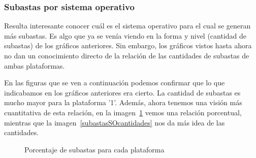 \documentclass[a4paper, 12pt]{article}
\begin{document}
	\subsubsection{Subastas por sistema operativo}
	 Resulta interesante conocer cuál es el sistema operativo para el cual se generan más subastas. Es algo que ya se venía viendo en la forma y nivel (cantidad de subastas) de los gráficos anteriores. Sin embargo, los gráficos vistos hasta ahora no dan un conocimiento directo de la relación de las cantidades de subastas de ambas plataformas.

	 En las figuras que se ven a continuación podemos confirmar que lo que indicabamos en los gráficos anteriores era cierto. La cantidad de subastas es mucho mayor para la plataforma '1'. Además, ahora tenemos una visión más cuantitativa de esta relación, en la imagen~\ref{subastasSOporcentajes} vemos una relación porcentual, mientras que la imagen~\ref{subastasSOcantidades} nos da más idea de las cantidades.

	\FloatBarrier
		\begin{figure}
			\centering
		   	\caption{Porcentaje de subastas para cada plataforma}
			\label{subastasSOporcentajes}
		\end{figure}
	\FloatBarrier
\end{document}
